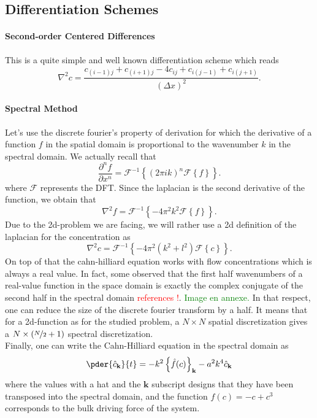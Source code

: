 \documentclass[10pt,a4paper,twocolumn]{article}
\begin{document}
\subsection{Differentiation Schemes} %
\label{sub:differentiation_schemes}

\paragraph{Second-order Centered Differences} This is a quite simple and well known differentiation scheme which reads
\begin{equation}
	\nabla^2 c = \frac{c_{(i-1)j} + c_{(i+1)j} - 4 c_{ij} + c_{i(j-1)} + c_{i(j+1)}}{(\Delta x)^2}.
\end{equation}

\paragraph{Spectral Method} Let's use the discrete fourier's property of derivation for which the derivative of a function $f$ in the spatial domain is proportional to the wavenumber $k$ in the spectral domain. We actually recall that
\begin{equation}
	\frac{\partial^n f}{\partial x^n} = \mathcal{F}^{-1} \left\{ (2\pi ik)^n \mathcal{F} \left\{ f \right\} \right\}.
\end{equation}
where $\mathcal F$ represents the DFT.
Since the laplacian is the second derivative of the function, we obtain that
\begin{equation}
	\nabla^2 f = \mathcal{F}^{-1} \left\{ -4\pi^2k^2 \mathcal{F} \left\{ f \right\} \right\}.
\end{equation}
Due to the 2d-problem we are facing, we will rather use a 2d definition of the laplacian for the concentration as
\begin{equation}
	\nabla^2 c = \mathcal{F}^{-1} \left\{ -4\pi^2(k^2+l^2) \mathcal{F} \left\{ c \right\} \right\}.
\end{equation}
On top of that the cahn-hilliard equation works with flow concentrations which is always a real value. In fact, some observed that the first half wavenumbers of a real-value function in the space domain is exactly the complex conjugate of the second half in the spectral domain \textcolor{red}{references !}. \textcolor{green}{Image en annexe.} In that respect, one can reduce the size of the discrete fourier transform by a half. It means that for a 2d-function as for the studied problem, a $N \times N$ spatial discretization gives a $N \times (\nicefrac{N}{2}+1)$ spectral discretization.
\vspace{\baselineskip}\\
Finally, one can write the Cahn-Hilliard equation in the spectral domain as
\begin{equation}
	\pder{\hat c_\mathbf{k}}{t} = -k^2 \left\{ \hat f(c) \right\}_\mathbf{k} - a^2 k^4 \hat c_\mathbf{k}
\end{equation}
where the values with a hat and the $\mathbf{k}$ subscript designs that they have been transposed into the spectral domain, and the function $f(c) = -c + c^3$ corresponds to the bulk driving force of the system.
\end{document}
